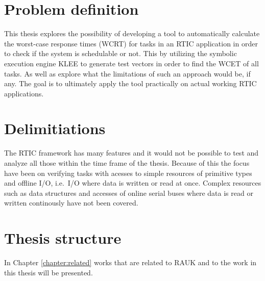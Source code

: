 
\section{Problem definition}
This thesis explores the possibility of developing a tool to automatically
calculate the worst-case response times (WCRT)  for tasks in an RTIC
application in order to check if the system is schedulable or not. This by
utilizing the symbolic execution engine KLEE to generate test vectors in
order to find the WCET of all tasks. As well as explore what the limitations of
such an approach would be, if any. The goal is to ultimately apply the tool
practically on actual working RTIC applications.

\section{Delimitiations}
The RTIC framework has many features and it would not be possible to test and
analyze all those within the time frame of the thesis.  Because of this the
focus have been on verifying tasks with acesses to simple resources of
primitive types and offline I/O, i.e.\ I/O where data is written or read at
once. Complex resources such as data structures and accesses of online serial
buses where data is read or written continously have not been covered.

\section{Thesis structure}
In Chapter \ref{chapter:related} works that are related to RAUK and to the work in
this thesis will be presented.
